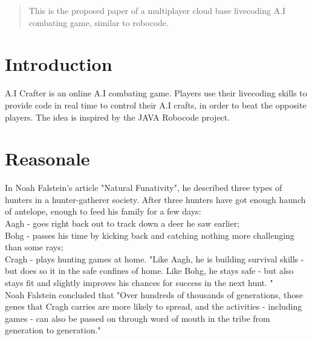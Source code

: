 \documentclass[12pt]{article}
\begin{document}
\maketitle

\begin{abstract}
This is the proposed paper of a multiplayer cloud base livecoding A.I combating game, similar to robocode.
\end{abstract}

\section{Introduction}
A.I Crafter is an online A.I combating game. Players use their livecoding skills to provide code in real time to control their A.I crafts, in order to beat the opposite players. The idea is inspired by the JAVA Robocode\cite{robocode01} project.

\section{Reasonale}
In Noah Falstein's article "Natural Funativity"\cite{noah2004}, he described three types of hunters in a hunter-gatherer society. After three hunters have got enough haunch of antelope, enough to feed his family for a few days:\\
Aagh - goes right back out to track down a deer he saw earlier;\\
Bohg - passes his time by kicking back and catching nothing more challenging than some rays;\\
Cragh - plays hunting games at home. "Like Aagh, he is building survival skills - but does so it in the safe confines of home. Like Bohg, he stays safe - but also stays fit and slightly improves his chances for success in the next hunt. "\\
Noah Falstein concluded that "Over hundreds of thousands of generations, those genes that Cragh carries are more likely to spread, and the activities - including games - can also be passed on through word of mouth in the tribe from generation to generation."\\
\end{document}
